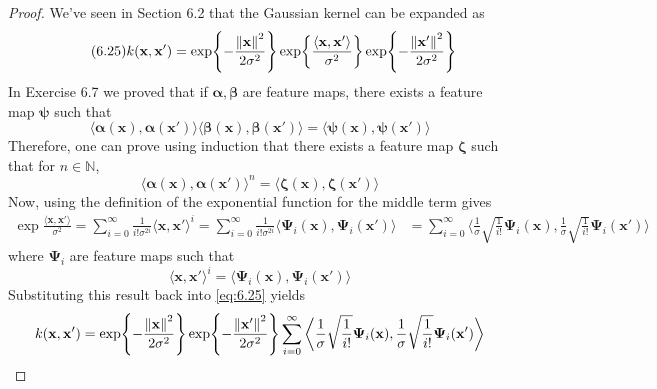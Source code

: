 \vspace{1em}

\begin{proof}
    We've seen in Section 6.2 that the Gaussian kernel can be expanded
    as
    \begin{equation}\label{eq:6.25}\tag{6.25}
        k(\mathbf{x}, \mathbf{x}') 
        = \exp{-\frac{\norm{\mathbf{x}}^2}{2\sigma^2}}
        \exp{\frac{\langle \mathbf{x}, \mathbf{x}' \rangle}{\sigma^2}}
        \exp{-\frac{\norm{\mathbf{x}'}^2}{2\sigma^2}}
    \end{equation}
    In Exercise 6.7 we proved that if $\bm{\alpha}, \bm{\beta}$ are feature maps,
    there exists a feature map $\bm{\psi}$ such that
    \[
        \langle \bm{\alpha}(\mathbf{x}), \bm{\alpha}(\mathbf{x}') \rangle
        \langle \bm{\beta}(\mathbf{x}), \bm{\beta}(\mathbf{x}') \rangle
        = \langle \bm{\bm{\psi}}(\mathbf{x}), \bm{\psi}(\mathbf{x}') \rangle
    \] 
    Therefore, one can prove using induction that there exists a feature map $\bm{\zeta}$
    such that for $n \in \mathbb{N}$,
    \[
        \langle \bm{\alpha}(\mathbf{x}), \bm{\alpha}(\mathbf{x}')\rangle^n
        = \langle \bm{\zeta}(\mathbf{x}), \bm{\zeta}(\mathbf{x}') \rangle
    \] 
    Now, using the definition of the exponential function for the middle term gives
    \begin{align*}
        \exp{\frac{\langle \mathbf{x}, \mathbf{x}' \rangle}{\sigma^2}}
        = \sum_{i=0}^{\infty} \frac{1}{i! \sigma^{2i}} \langle \mathbf{x}, \mathbf{x}' \rangle^i
        = \sum_{i=0}^{\infty} \frac{1}{i! \sigma^{2i}}
        \langle \bm{\Psi}_i(\mathbf{x}), \bm{\Psi}_i(\mathbf{x}') \rangle
        &= \sum_{i=0}^{\infty} 
        \bigg\langle \frac{1}{\sigma}\sqrt{\frac{1}{i!}} \bm{\Psi}_i(\mathbf{x}),
        \frac{1}{\sigma}\sqrt{\frac{1}{i!}} \bm{\Psi}_i(\mathbf{x}') \bigg\rangle
    \end{align*}
    where $\bm{\Psi}_i$ are feature maps such that
    \[
        \langle\mathbf{x}, \mathbf{x}'\rangle^i 
        = \langle \bm{\Psi}_i(\mathbf{x}), \bm{\Psi}_i(\mathbf{x}')\rangle 
    \] 
    Substituting this result back into \eqref{eq:6.25} yields
    \begin{align*}
        k(\mathbf{x}, \mathbf{x}')
        &= \exp{-\frac{\norm{\mathbf{x}}^2}{2\sigma^2}}
        \exp{-\frac{\norm{\mathbf{x}'}^2}{2\sigma^2}}
        \sum_{i=0}^{\infty} \bigg\langle \frac{1}{\sigma}\sqrt{\frac{1}{i!}} \bm{\Psi}_i(\mathbf{x}),
        \frac{1}{\sigma}\sqrt{\frac{1}{i!}} \bm{\Psi}_i(\mathbf{x}') \bigg\rangle \\

\end{align*}
\end{proof}
